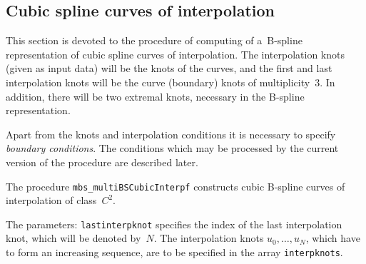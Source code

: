 \subsection{Cubic spline curves of interpolation}

This section is devoted to the procedure of computing of a~B-spline
representation of cubic spline curves of interpolation. The interpolation
knots (given as input data) will be the knots of the curves, and the first
and last interpolation knots will be the curve (boundary) knots of
multiplicity~$3$. In addition, there will be two extremal knots,
necessary in the B-spline representation.
 
Apart from the knots and interpolation conditions it is necessary
to specify \emph{boundary conditions}. The conditions which may be processed
by the current version of the procedure are described later.

\vspace{\bigskipamount}
\begin{sloppypar}
The procedure \texttt{mbs\_multiBSCubicInterpf} constructs cubic B-spline
curves of interpolation of class~$C^2$.
\end{sloppypar}
\begin{sloppypar}
The parameters: \texttt{lastinterpknot} specifies the index of the last
interpolation knot, which will be denoted by~$N$. The interpolation knots
$u_0,\ldots,u_N$, which have to form an increasing sequence,
are to be specified in the array \texttt{interpknots}.
\end{sloppypar}


